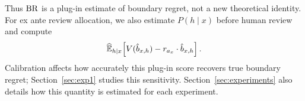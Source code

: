 Thus $\operatorname{BR}$ is a plug-in estimate of boundary regret, not a new theoretical identity.
For ex ante review allocation, we also estimate $P(h \mid x)$ before human review and compute
\begin{equation}
    \widehat{\mathbb{E}}_{h \mid x}\!\left[V(\hat{b}_{x,h}) - r_{a_x} \cdot \hat{b}_{x,h}\right].
\label{eq:ex-ante-brhat}
\end{equation}
Calibration affects how accurately this plug-in score recovers true boundary regret; Section~\ref{sec:exp1} studies this sensitivity.
Section~\ref{sec:experiments} also details how this quantity is estimated for each experiment.
